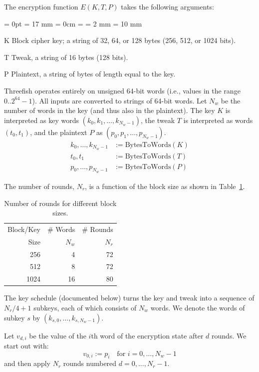\documentclass[11pt,twoside]{article}
\def\symdef#1{\label{symdef:#1}}
\newcommand{\BytesToWords}{\text{BytesToWords}\xspace}
\newcommand{\parameterlabel}[1]{$#1$\hfill}
\newenvironment{parameters}{\begin{list}{?}{%
\parsep = 0pt
\leftmargin = 17 mm
\rightmargin = 0cm
\listparindent = \parindent
\labelsep = 2 mm
\labelwidth = 10 mm
\let\makelabel\parameterlabel
}%
}{\end{list}}
\begin{document}
The encryption function $E( K, T, P )$ takes the following arguments:
\begin{parameters}
  \item[K] Block cipher key; a string of 32, 64, or 128 bytes (256, 512, or 1024 bits).\symdef{Threefish-K}
  \item[T] Tweak, a string of 16 bytes (128 bits).
  \item[P] Plaintext, a string of bytes of length equal to the key.\symdef{P}
\end{parameters}
Threefish operates entirely on unsigned 64-bit words (i.e., values in the range $0..2^{64}-1$). All inputs are converted to strings of 64-bit words. Let $N_w$ be the number of words in the key (and thus also in the plaintext)\symdef{N_w}. The key $K$ is interpreted as key words $(k_0, k_1, \ldots, k_{N_w - 1})$, the tweak $T$ is interpreted as words $(t_0, t_1)$, and the plaintext $P$ as $(p_0, p_1, \ldots, p_{N_w - 1})$. \symdef{k_i}\symdef{t_i}\symdef{p_i}
\begin{align*}
  k_0, \ldots, k_{N_w-1} &:= \BytesToWords( K )\\
  t_0, t_1 &:= \BytesToWords( T ) \\
  p_0, \ldots, p_{N_w-1} &:=\BytesToWords( P )
\end{align*}

The number of rounds, $N_r$, is a function of the block size as shown in Table~\ref{tab:rounds}\symdef{N_r}.
%
\begin{table}[htbp]
  \begin{center}
    \begin{tabular}{|rrr|}
    \hline
    Block/Key & \# Words & \# Rounds\\
    Size      & $N_w$    & $N_r$ \\
    \hline
     256 &  4 & 72 \\
     512 &  8 & 72 \\
    1024 & 16 & 80 \\
    \hline
    \end{tabular}
  \end{center}\caption{Number of rounds for different block sizes.}
  \label{tab:rounds}
\end{table}
%

The key schedule (documented below) turns the key and tweak into a sequence of $N_r/4 + 1$ subkeys, each of which consists of $N_w$ words. We denote the words of subkey $s$ by $(k_{s,0}, \ldots, k_{s,N_w-1})$. \symdef{s}

Let $v_{d,i}$ be the value of the $i$th word of the encryption state after $d$ rounds. \symdef{v_di} We start out with:
\[
v_{0,i} := p_i \quad \text{for $i=0,\ldots,N_w-1$}
\]
and then apply $N_r$ rounds numbered $d = 0, \ldots, N_r-1$. \symdef{d}
\end{document}
